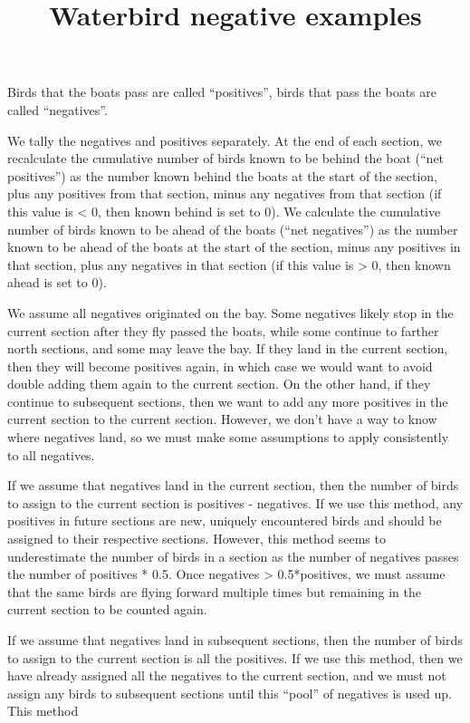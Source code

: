 \documentclass[
]{article}
\title{Waterbird negative examples}
\author{}
\date{\vspace{-2.5em}}
\begin{document}
\maketitle

Birds that the boats pass are called ``positives'', birds that pass the
boats are called ``negatives''.

We tally the negatives and positives separately. At the end of each
section, we recalculate the cumulative number of birds known to be
behind the boat (``net positives'') as the number known behind the boats
at the start of the section, plus any positives from that section, minus
any negatives from that section (if this value is \textless{} 0, then
known behind is set to 0). We calculate the cumulative number of birds
known to be ahead of the boats (``net negatives'') as the number known
to be ahead of the boats at the start of the section, minus any
positives in that section, plus any negatives in that section (if this
value is \textgreater{} 0, then known ahead is set to 0).

We assume all negatives originated on the bay. Some negatives likely
stop in the current section after they fly passed the boats, while some
continue to farther north sections, and some may leave the bay. If they
land in the current section, then they will become positives again, in
which case we would want to avoid double adding them again to the
current section. On the other hand, if they continue to subsequent
sections, then we want to add any more positives in the current section
to the current section. However, we don't have a way to know where
negatives land, so we must make some assumptions to apply consistently
to all negatives.

If we assume that negatives land in the current section, then the number
of birds to assign to the current section is positives - negatives. If
we use this method, any positives in future sections are new, uniquely
encountered birds and should be assigned to their respective sections.
However, this method seems to underestimate the number of birds in a
section as the number of negatives passes the number of positives * 0.5.
Once negatives \textgreater{} 0.5*positives, we must assume that the
same birds are flying forward multiple times but remaining in the
current section to be counted again.

If we assume that negatives land in subsequent sections, then the number
of birds to assign to the current section is all the positives. If we
use this method, then we have already assigned all the negatives to the
current section, and we must not assign any birds to subsequent sections
until this ``pool'' of negatives is used up. This method
\end{document}
